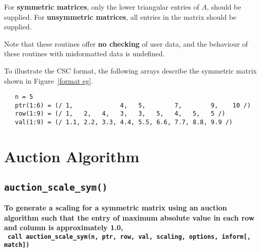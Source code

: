 For \textbf{symmetric matrices}, only the lower triangular entries of $A$,
should be supplied. For \textbf{unsymmetric matrices}, all entries in the matrix
should be supplied.

Note that these routines offer \textbf{no checking} of user data, and the
behaviour of these routines with misformatted data is undefined.

To illustrate the CSC format, the following arrays describe the symmetric
matrix shown in Figure~\ref{format eg}.
\begin{verbatim}
   n = 5
   ptr(1:6) = (/ 1,             4,   5,        7,        9,    10 /)
   row(1:9) = (/ 1,   2,   4,   3,   3,   5,   4,   5,   5 /)
   val(1:9) = (/ 1.1, 2.2, 3.3, 4.4, 5.5, 6.6, 7.7, 8.8, 9.9 /)
\end{verbatim}



\section{Auction Algorithm}

\subsection{\texttt{auction\_scale\_sym()}}

\textbf{\noindent
   To generate a scaling for a symmetric matrix using an auction algorithm such that the entry of maximum absolute value in each row and column is approximately 1.0,
   \vspace*{0.3cm} \\
   \texttt{ \hspace*{0.2cm}
      call auction\_scale\_sym(n, ptr, row, val, scaling, options, inform[, match])
   }
   \vspace{0.3cm}
}

